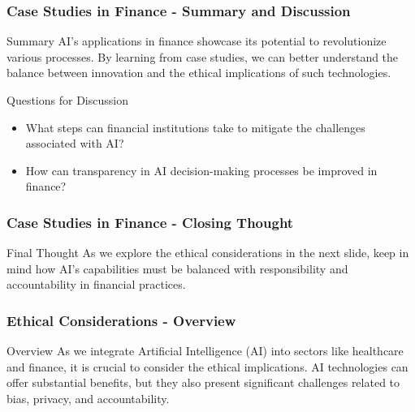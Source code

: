 \documentclass[aspectratio=169]{beamer}
\begin{document}
\begin{frame}[fragile]
    \frametitle{Case Studies in Finance - Summary and Discussion}
    \begin{block}{Summary}
        AI's applications in finance showcase its potential to revolutionize various processes. By learning from case studies, we can better understand the balance between innovation and the ethical implications of such technologies.
    \end{block}
    \begin{block}{Questions for Discussion}
        \begin{itemize}
            \item What steps can financial institutions take to mitigate the challenges associated with AI?
            \item How can transparency in AI decision-making processes be improved in finance?
        \end{itemize}
    \end{block}
\end{frame}

\begin{frame}[fragile]
    \frametitle{Case Studies in Finance - Closing Thought}
    \begin{block}{Final Thought}
        As we explore the ethical considerations in the next slide, keep in mind how AI's capabilities must be balanced with responsibility and accountability in financial practices.
    \end{block}
\end{frame}

\begin{frame}[fragile]
    \frametitle{Ethical Considerations - Overview}
    \begin{block}{Overview}
        As we integrate Artificial Intelligence (AI) into sectors like healthcare and finance, 
        it is crucial to consider the ethical implications. AI technologies can offer substantial benefits, 
        but they also present significant challenges related to bias, privacy, and accountability.
    \end{block}
\end{frame}
\end{document}
